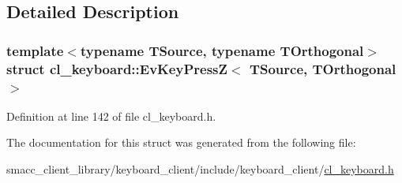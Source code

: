 \subsection{Detailed Description}
\subsubsection*{template$<$typename T\+Source, typename T\+Orthogonal$>$\newline
struct cl\+\_\+keyboard\+::\+Ev\+Key\+Press\+Z$<$ T\+Source, T\+Orthogonal $>$}



Definition at line 142 of file cl\+\_\+keyboard.\+h.



The documentation for this struct was generated from the following file\+:\begin{DoxyCompactItemize}
\item 
smacc\+\_\+client\+\_\+library/keyboard\+\_\+client/include/keyboard\+\_\+client/\hyperlink{cl__keyboard_8h}{cl\+\_\+keyboard.\+h}\end{DoxyCompactItemize}
